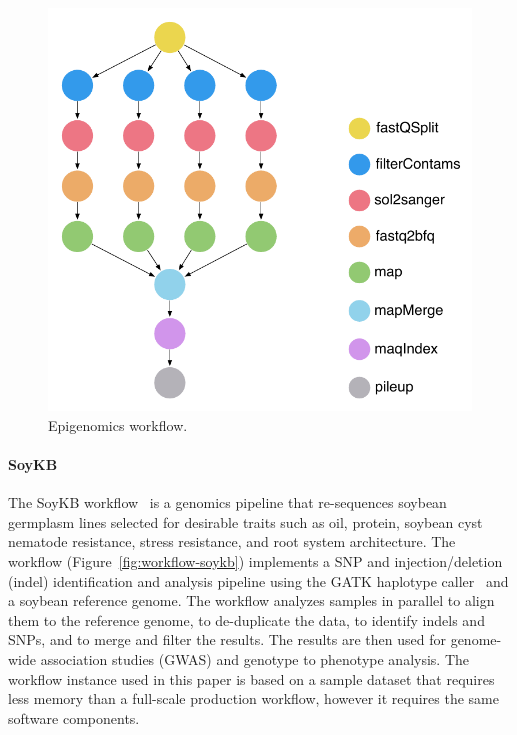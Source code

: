 \begin{figure}[!htb]
	\centering
	\includegraphics[width=0.75\linewidth]{figures/workflow-genome}
	\caption{Epigenomics workflow.}
	\label{fig:workflow-genome}
\end{figure}

\paragraph{\textbf{SoyKB}}
The SoyKB workflow~\cite{soybean, Joshi01012014} is a genomics pipeline 
that re-sequences soybean germplasm lines selected for desirable traits such 
as oil, protein, soybean cyst nematode resistance, stress resistance, and root 
system architecture. The workflow (Figure~\ref{fig:workflow-soykb}) 
implements a SNP and injection/deletion (indel) identification and analysis 
pipeline using the GATK haplotype caller~\cite{gatk} and a soybean reference 
genome. The workflow analyzes samples in parallel to align them to the reference 
genome, to de-duplicate the data, to identify indels and SNPs, and to merge and 
filter the results. The results are then used for genome-wide association studies 
(GWAS) and genotype to phenotype analysis. The workflow instance used in this 
paper is based on a sample dataset that requires less memory than a full-scale 
production workflow, however it requires the same software components.

